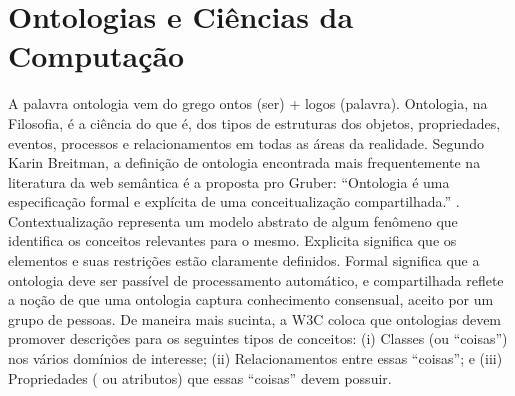 \section{Ontologias e Ciências da Computação}

A palavra ontologia vem do grego ontos (ser) + logos (palavra). Ontologia, na Filosofia, é a ciência do que é, dos tipos de estruturas dos objetos, propriedades, eventos, processos e relacionamentos em todas as áreas da realidade. Segundo Karin Breitman, a definição de ontologia encontrada mais frequentemente na literatura da web semântica é a proposta pro Gruber: “Ontologia é uma especificação formal e explícita de uma conceitualização compartilhada.” . Contextualização representa um modelo abstrato de algum fenômeno que identifica os conceitos relevantes para o mesmo. Explicita significa que os elementos e suas restrições estão claramente definidos. Formal significa que a ontologia deve ser passível de processamento automático, e compartilhada reflete a noção de que uma ontologia captura conhecimento consensual, aceito por um grupo de pessoas. De maneira mais sucinta, a W3C coloca que ontologias devem promover descrições para os seguintes tipos de conceitos: (i) Classes (ou “coisas”) nos vários domínios de interesse; (ii) Relacionamentos entre essas “coisas”; e (iii) Propriedades ( ou atributos) que essas “coisas” devem possuir. 



 






